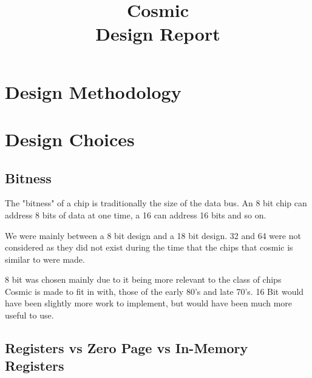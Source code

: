 \documentclass[conference]{IEEEtran}
\begin{document}
\title{
 Cosmic\\Design Report}

\author{
\and
{}

}

\maketitle

\section{Design Methodology}



\section{Design Choices}
\subsection{Bitness}
The "bitness" of a chip is traditionally the size of the data bus. An 8 bit chip can address 8 bits of data at one time, a 16 can address 16 bits and so on.

We were mainly between a 8 bit design and a 18 bit design. 32 and 64 were not considered as they did not exist during the time that the chips that cosmic is similar to were made.


8 bit was chosen mainly due to it being more relevant to the class of chips Cosmic is made to fit in with, those of the early 80's and late 70's. 16 Bit would have been slightly more work to implement, but would have been much more useful to use.

\subsection{Registers vs Zero Page vs In-Memory Registers}
\end{document}
